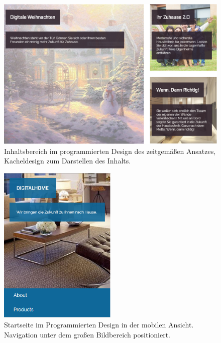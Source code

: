 \begin{figure} [hp]
	\includegraphics[width=\textwidth]{./img/zeitg_struktur2.png}
	\caption{Inhaltsbereich im programmierten Design des zeitgemäßen Ansatzes, Kacheldesign zum Darstellen des Inhalts.}
	\label{zeitg:struktur2}
\end{figure}

\begin{figure} [hp]
	\includegraphics[width=0.5\textwidth]{./img/zeitg_struktur3.png}
	\caption{Startseite im Programmierten Design in der mobilen Ansicht. Navigation unter dem großen Bildbereich positioniert.}
	\label{zeitg:struktur3}
\end{figure}

